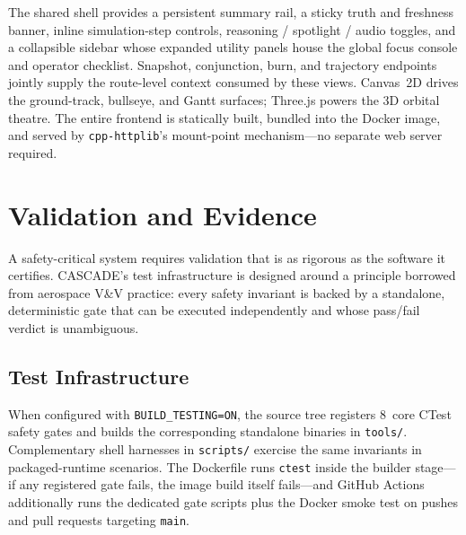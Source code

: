 \documentclass[10pt,twocolumn,letterpaper]{article}
\begin{document}
\noindent
The shared shell provides a persistent summary rail, a sticky truth and
freshness banner, inline simulation-step controls, reasoning / spotlight /
audio toggles, and a collapsible sidebar whose expanded utility panels house
the global focus console and operator checklist.  Snapshot, conjunction,
burn, and trajectory endpoints jointly supply the route-level context
consumed by these views.  Canvas~2D drives the ground-track, bullseye, and
Gantt surfaces; Three.js powers the 3D orbital theatre.  The entire
frontend is statically built, bundled into the Docker image, and served by
\texttt{cpp-httplib}'s mount-point mechanism---no separate web server
required.

\section{Validation and Evidence}\label{sec:validation}

A safety-critical system requires validation that is as rigorous as the
software it certifies.  CASCADE's test infrastructure is designed around a
principle borrowed from aerospace V\&V practice: every safety invariant is
backed by a standalone, deterministic gate that can be executed
independently and whose pass/fail verdict is unambiguous.

\subsection{Test Infrastructure}

When configured with \texttt{BUILD\_TESTING=ON}, the source tree registers
8~core CTest safety gates and builds the corresponding standalone binaries
in \texttt{tools/}.  Complementary shell harnesses in \texttt{scripts/}
exercise the same invariants in packaged-runtime scenarios.  The Dockerfile
runs \texttt{ctest} inside the builder stage---if any registered gate
fails, the image build itself fails---and GitHub Actions additionally runs
the dedicated gate scripts plus the Docker smoke test on pushes and pull
requests targeting \texttt{main}.
\end{document}
